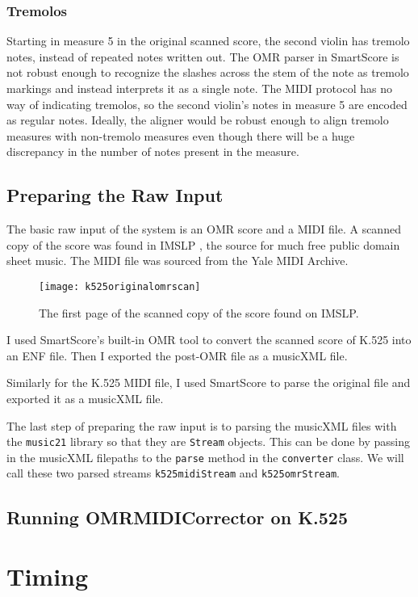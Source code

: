 \subsubsection{Tremolos}
Starting in measure 5 in the original scanned score, the second violin has tremolo notes, instead of repeated  notes written out. The OMR parser in SmartScore is not robust enough to recognize the slashes across the stem of the note as tremolo markings and instead interprets it as a single note. The MIDI protocol has no way of indicating tremolos, so the second violin's notes in measure 5 are encoded as regular  notes. Ideally, the aligner would be robust enough to align tremolo measures with non-tremolo measures even though there will be a huge discrepancy in the number of notes present in the measure.

\subsection{Preparing the Raw Input}
The basic raw input of the system is an OMR score and a MIDI file. A scanned copy of the score was found in IMSLP \cite{k525}, the source for much free public domain sheet music. The MIDI file was sourced from the Yale MIDI Archive. 

\begin{figure}[H]
\centering
\texttt{[image: k525originalomrscan]}
\caption{The first page of the scanned copy of the score found on IMSLP.}
\end{figure}

I used SmartScore's built-in OMR tool to convert the scanned score of K.525 into an ENF file. Then I exported the post-OMR file as a musicXML file.

Similarly for the K.525 MIDI file, I used SmartScore to parse the original file and exported it as a musicXML file. 

The last step of preparing the raw input is to parsing the musicXML files with the \texttt{music21} library so that they are \texttt{Stream} objects. This can be done by passing in the musicXML filepaths to the \texttt{parse} method in the \texttt{converter} class. We will call these two parsed streams \texttt{k525midiStream} and \texttt{k525omrStream}. 

\subsection{Running OMRMIDICorrector on K.525}

\section{Timing} \label{timing}

